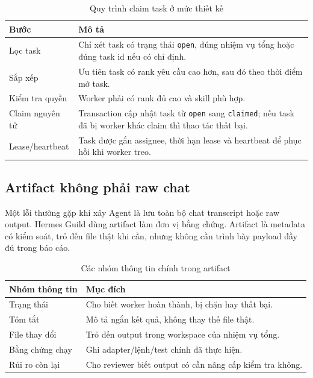 \documentclass[12pt,a4paper]{article}
\begin{document}
\begin{table}[H]
\centering
\caption{Quy trình claim task ở mức thiết kế}
\begin{tabular}{p{}p{}}
\toprule
\textbf{Bước} & \textbf{Mô tả} \\
\midrule
Lọc task & Chỉ xét task có trạng thái \texttt{open}, đúng nhiệm vụ tổng hoặc đúng task id nếu có chỉ định. \\
Sắp xếp & Ưu tiên task có rank yêu cầu cao hơn, sau đó theo thời điểm mở task. \\
Kiểm tra quyền & Worker phải có rank đủ cao và skill phù hợp. \\
Claim nguyên tử & Transaction cập nhật task từ \texttt{open} sang \texttt{claimed}; nếu task đã bị worker khác claim thì thao tác thất bại. \\
Lease/heartbeat & Task được gắn assignee, thời hạn lease và heartbeat để phục hồi khi worker treo. \\
\bottomrule
\end{tabular}
\end{table}

\subsection{Artifact không phải raw chat}

Một lỗi thường gặp khi xây Agent là lưu toàn bộ chat transcript hoặc raw output. Hermes Guild dùng artifact làm đơn vị bằng chứng. Artifact là metadata có kiểm soát, trỏ đến file thật khi cần, nhưng không cần trình bày payload đầy đủ trong báo cáo.

\begin{table}[H]
\centering
\caption{Các nhóm thông tin chính trong artifact}
\begin{tabular}{p{}p{}}
\toprule
\textbf{Nhóm thông tin} & \textbf{Mục đích} \\
\midrule
Trạng thái & Cho biết worker hoàn thành, bị chặn hay thất bại. \\
Tóm tắt & Mô tả ngắn kết quả, không thay thế file thật. \\
File thay đổi & Trỏ đến output trong workspace của nhiệm vụ tổng. \\
Bằng chứng chạy & Ghi adapter/lệnh/test chính đã thực hiện. \\
Rủi ro còn lại & Cho reviewer biết output có cần nâng cấp kiểm tra không. \\
\bottomrule
\end{tabular}
\end{table}
\end{document}
